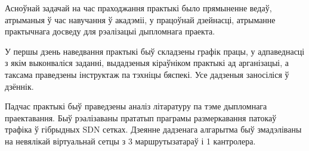 
Асноўнай задачай на час праходжання практыкі было прямыненне ведаў, атрыманыя ў час навучання ў акадэміі, у працоўнай дзейнасці, атрыманне практычнага досведу для рэалізацыі дыпломнага праекта.

У першы дзень наведвання практыкі быў складзены графік працы, у адпаведнасці з якім выконваліся заданні, выдадзеныя кіраўніком практыкі ад арганізацыі, а таксама праведзены інструктаж па тэхніцы бяспекі. Усе дадзеныя заносіліся ў дзённік.

Падчас практыкі быў праведзены аналіз літаратуру па тэме дыпломнага праектавання. Быў рэалізаваны
прататып праграмы размеркавання патокаў трафіка ў гібрыдных SDN сетках. Дзеянне дадзенага алгарытма
быў змадэліваны на невялікай віртуальнай сетцы з 3 маршрутызатараў і 1 кантролера.
